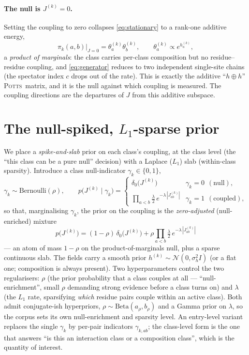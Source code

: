 \documentclass[11pt]{article}
\newcommand{\Potts}{\textsc{Potts}}
\begin{document}
\paragraph{The null is $J^{(k)}=0$.} Setting the coupling to zero collapses
\eqref{eq:stationary} to a rank-one additive energy,
\begin{equation}
\pi_k(a,b)\big|_{J=0}=\theta^{(k)}_a\theta^{(k)}_b,\qquad \theta^{(k)}_a\propto e^{h^{(k)}_a},
\end{equation}
a \emph{product of marginals}: the class carries per-class composition but no
residue--residue coupling, and \eqref{eq:generator} reduces to two independent single-site
chains (the spectator index $c$ drops out of the rate). This is exactly the additive
``$h\oplus h$'' \Potts\ matrix, and it is the null against which coupling is measured.
The coupling directions are the departures of $J$ from this additive subspace.

\section{The null-spiked, $L_1$-sparse prior}
\label{sec:prior}

We place a \emph{spike-and-slab} prior on each class's coupling, at the class level (the
``this class can be a pure null'' decision) with a Laplace ($L_1$) slab (within-class
sparsity). Introduce a class null-indicator $\gamma_k\in\{0,1\}$,
\begin{equation}
\label{eq:prior}
\gamma_k\sim\mathrm{Bernoulli}(\rho),\qquad
p\big(J^{(k)}\mid\gamma_k\big)=
\begin{cases}
\delta_0\!\big(J^{(k)}\big) & \gamma_k=0\ \ (\text{null}),\\[4pt]
\displaystyle\prod_{a<b}\tfrac{\lambda}{2}\,e^{-\lambda\,|J^{(k)}_{ab}|} & \gamma_k=1\ \ (\text{coupled}),
\end{cases}
\end{equation}
so that, marginalising $\gamma_k$, the prior on the coupling is the \emph{zero-adjusted}
(null-enriched) mixture
\begin{equation}
\label{eq:zeroadj}
p\big(J^{(k)}\big)=(1-\rho)\,\delta_0\!\big(J^{(k)}\big)
   +\rho\prod_{a<b}\tfrac{\lambda}{2}\,e^{-\lambda\,|J^{(k)}_{ab}|}
\end{equation}
--- an atom of mass $1-\rho$ on the product-of-marginals null, plus a sparse continuous
slab. The fields carry a smooth prior $h^{(k)}\sim\mathcal N(0,\sigma_h^2 I)$ (or a flat
one; composition is always present). Two hyperparameters control the two regularisers:
$\rho$ (the prior probability that a class couples at all --- ``null-enrichment'', small
$\rho$ demanding strong evidence before a class turns on) and $\lambda$ (the $L_1$ rate,
sparsifying \emph{which} residue pairs couple within an active class). Both admit
conjugate-ish hyperpriors, $\rho\sim\mathrm{Beta}(a_\rho,b_\rho)$ and a Gamma prior on
$\lambda$, so the corpus sets its own null-enrichment and sparsity level. An entry-level
variant replaces the single $\gamma_k$ by per-pair indicators $\gamma_{k,ab}$; the
class-level form is the one that answers ``is this an interaction class or a composition
class'', which is the quantity of interest.
\end{document}
